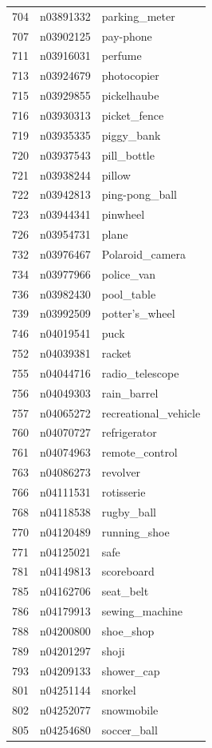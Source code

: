 \begin{table}
\begin{tabular}{cll}
704 & n03891332 & parking_meter \\
707 & n03902125 & pay-phone \\
711 & n03916031 & perfume \\
713 & n03924679 & photocopier \\
715 & n03929855 & pickelhaube \\
716 & n03930313 & picket_fence \\
719 & n03935335 & piggy_bank \\
720 & n03937543 & pill_bottle \\
721 & n03938244 & pillow \\
722 & n03942813 & ping-pong_ball \\
723 & n03944341 & pinwheel \\
726 & n03954731 & plane \\
732 & n03976467 & Polaroid_camera \\
734 & n03977966 & police_van \\
736 & n03982430 & pool_table \\
739 & n03992509 & potter's_wheel \\
746 & n04019541 & puck \\
752 & n04039381 & racket \\
755 & n04044716 & radio_telescope \\
756 & n04049303 & rain_barrel \\
757 & n04065272 & recreational_vehicle \\
760 & n04070727 & refrigerator \\
761 & n04074963 & remote_control \\
763 & n04086273 & revolver \\
766 & n04111531 & rotisserie \\
768 & n04118538 & rugby_ball \\
770 & n04120489 & running_shoe \\
771 & n04125021 & safe \\
781 & n04149813 & scoreboard \\
785 & n04162706 & seat_belt \\
786 & n04179913 & sewing_machine \\
788 & n04200800 & shoe_shop \\
789 & n04201297 & shoji \\
793 & n04209133 & shower_cap \\
801 & n04251144 & snorkel \\
802 & n04252077 & snowmobile \\
805 & n04254680 & soccer_ball \\

\end{tabular}
\end{table}
